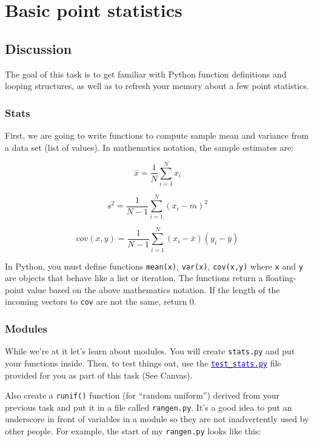 \chapter{Basic point statistics}

\setcounter{problem}{1}
\section{Discussion}

\begin{fullwidth}

The goal of this task is to get familiar with Python function definitions and looping structures, as well as to refresh your memory about a few point statistics. 

\subsection{Stats}

First, we are going to write functions to compute sample mean and variance from a data set (list of values).  In mathematics notation, the sample estimates are:

\[\tag{Sample mean}
\bar x = \frac{1}{N} \sum_{i=1}^{N} x_i 
\]

\[\tag{Unbiased sample variance}
s^2 = \frac{1}{N-1} \sum_{i=1}^{N} (x_i - m)^2
\]

\[\tag{Unbiased sample covariance}
cov(x,y) = \frac{1}{N-1} \sum_{i=1}^{N} (x_i - \bar x)(y_i - \bar y)
\]

In Python, you must define functions {\tt mean(x)}, {\tt var(x)}, {\tt cov(x,y)} where {\tt x} and {\tt y} are objects that behave like a list or iteration. The functions return a floating-point value based on the above mathematics notation. If the length of the incoming vectors to {\tt cov} are not the same, return 0.

\subsection{Modules}

While we're at it let's learn about modules. You will create {\tt stats.py} and put your functions inside. Then, to test things out, use the \href{https://usfca.instructure.com/courses/1053753/assignments/3459436}{\textcolor{blue}{\tt test\_stats.py}} file provided for you as part of this task (See Canvas).

Also create a {\tt runif()} function (for ``random uniform'') derived from your previous task and put it in a file called {\tt rangen.py}.   It's a good idea to put an underscore in front of variables in a module so they are not inadvertently used by other people. For example, the start of my {\tt rangen.py} looks like this:


\end{fullwidth}
